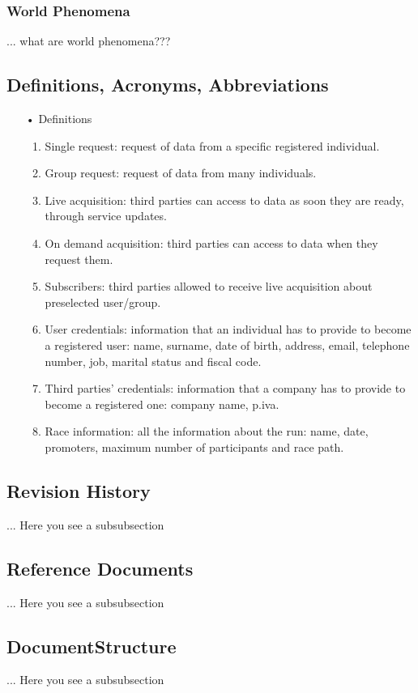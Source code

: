 \subsubsection{World Phenomena}
... what are world phenomena???

\subsection{Definitions, Acronyms, Abbreviations}

\begin{enumerate}
\item[•] {\Large Definitions}
	\begin{enumerate}
		\item Single request: request of data from a specific registered individual.
		\item Group request: request of data from many individuals. 
		\item Live acquisition: third parties can access to data as soon they are ready, 				through service updates.
		\item On demand acquisition: third parties can access to data when they request 				them.
		\item Subscribers: third parties allowed to receive live acquisition about 						preselected	user/group.
		\item User credentials: information that an individual has to provide to become a 				registered user: name, surname, date of birth, address, email, telephone
			number, job, marital status and fiscal code. 
		\item Third parties' credentials: information that a company has to provide to 					become a registered one: company name, p.iva.
		\item Race information: all the information about the run: name, date, promoters, 				maximum number of participants and race path.
	\end{enumerate}
\end{enumerate}
	
\subsection{Revision History}
... Here you see a subsubsection
\subsection{Reference Documents}
... Here you see a subsubsection
\subsection{DocumentStructure}
... Here you see a subsubsection

